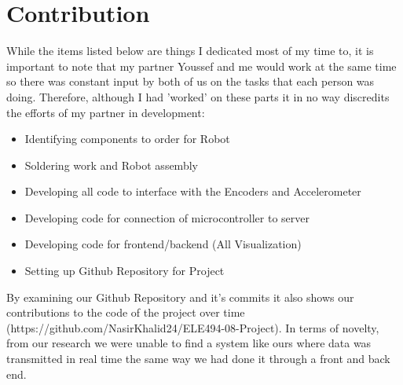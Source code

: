 \documentclass[a4paper, 12pt]{article}
\begin{document}
    \section{Contribution}

    While the items listed below are things I dedicated most of my time to, it is important to note that my partner Youssef and
    me would work at the same time so there was constant input by both of us on the tasks that each person was doing. Therefore, although
    I had 'worked' on these parts it in no way discredits the efforts of my partner in development:
    
    \begin{itemize}
        \item Identifying components to order for Robot
        \item Soldering work and Robot assembly
        \item Developing all code to interface with the Encoders and Accelerometer
        \item Developing code for connection of microcontroller to server
        \item Developing code for frontend/backend (All Visualization)
        \item Setting up Github Repository for Project
    \end{itemize}

    By examining our Github Repository and it's commits it also shows our contributions to the code of the project
    over time (https://github.com/NasirKhalid24/ELE494-08-Project). In terms of novelty, from our research we were unable
    to find a system like ours where data was transmitted in real time the same way we had done it through a front and back end.
\end{document}
